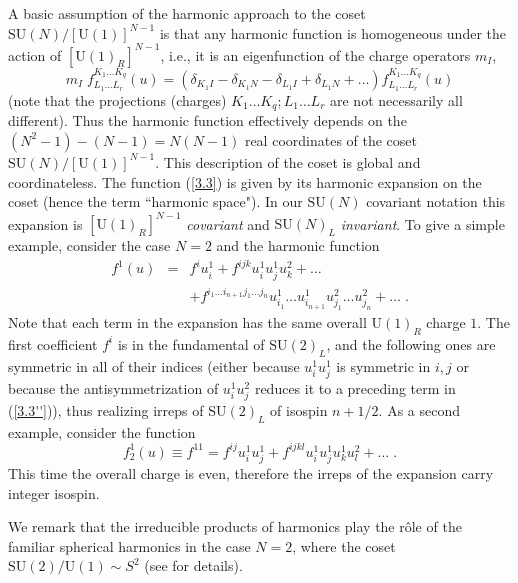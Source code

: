 \documentclass[a4paper,12pt]{article}
\begin{document}
A basic assumption of the  harmonic approach to the coset 
$\mbox{SU}(N)/[\mbox{U}(1)]^{N-1}$ is that any harmonic function 
is homogeneous under the action of $[\mbox{U}(1)_R]^{N-1}$, i.e., 
it is an eigenfunction of the charge operators $m_I$, 
\begin{equation}\label{3.3}
m_I\; f^{K_1\ldots K_q}_{L_1\ldots L_r}(u) = (\delta_{K_1I} 
-\delta_{K_1N} - \delta_{L_1I} +\delta_{L_1N} +\ldots)f^{K_1\ldots 
K_q}_{L_1\ldots L_r}(u) 
\end{equation}
(note that the projections (charges) $K_1\ldots K_q;L_1\ldots L_r$ 
are not necessarily all different). Thus the harmonic function 
effectively depends on the $(N^2-1)-(N-1)=N(N-1)$ real coordinates 
of the coset  $\mbox{SU}(N)/[\mbox{U}(1)]^{N-1}$. This description 
of the coset is global and coordinateless. The function 
(\ref{3.3}) is given by its harmonic expansion on the coset (hence 
the term ``harmonic space"). In our $\mbox{SU}(N)$ covariant 
notation this expansion is $[\mbox{U}(1)_R]^{N-1}$ {\sl covariant} 
and $\mbox{SU}(N)_L$ {\sl invariant}. To give a simple example, 
consider the case $N=2$ and the harmonic function 
\begin{eqnarray}
 f^1(u) &=& f^iu^1_{i} + f^{ijk}u^1_i u^1_j u^2_k + \ldots  \nonumber\\
  && + f^{i_1\ldots i_{n+1}j_1\ldots j_{n}}u^1_{i_1}\ldots u^1_{i_{n+1}} 
u^2_{j_1}\ldots u^2_{j_n}+ \ldots \;. \label{3.3''} 
\end{eqnarray}
Note that each term in the expansion has the same overall 
$\mbox{U}(1)_R$ charge $1$. The first coefficient $f^i$ is in the 
fundamental of $\mbox{SU}(2)_L$, and the following ones are 
symmetric in all of their indices (either because $u^1_iu^1_j$ is 
symmetric in $i,j$ or because the antisymmetrization of 
$u^1_iu^2_j$ reduces it to a preceding term in (\ref{3.3''})), 
thus realizing irreps of $\mbox{SU}(2)_L$ of isospin $n+1/2$. As a 
second example, consider the function 
\begin{equation}\label{3.3'''}
  f^1_2(u) \equiv f^{11} = f^{ij}u^1_i u^1_j + f^{ijkl}u^1_i u^1_ju^1_k 
u^2_l + \ldots\;.
\end{equation}
This time the overall charge is even, therefore the irreps of the 
expansion carry integer isospin. 
 
We remark that the irreducible products of harmonics play the r\^{o}le 
of the familiar spherical harmonics in the case $N=2$, where the 
coset $\mbox{SU}(2)/\mbox{U}(1)\sim S^2$ (see \cite{GIK1} for 
details).  
\end{document}
